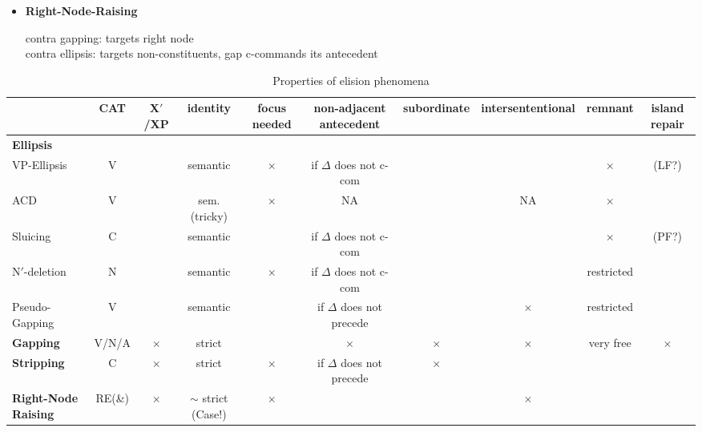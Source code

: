 \documentclass[landscape,10pt,oneside]{article}
\newcommand{\tophead}[1]{\textbf{\Large #1}}
\begin{document}
\begin{minipage}[t]{0.5\textwidth}
\begin{itemize}
		\item \tophead{Right-Node-Raising}
% 
		contra gapping: targets right node\\
		contra ellipsis: targets non-constituents, gap c-commands its antecedent
\end{itemize}
\end{minipage}

\begin{table}[tbh]
\begin{center}
\begin{tabular}{lccccccccc}
	& CAT & X$'$/XP & identity & focus needed & non-adjacent antecedent & subordinate & intersententional & remnant & island repair\\ \hline
	\textbf{Ellipsis} & & & & & & & & &\\
	\quad VP-Ellipsis & V & \checkmark & semantic & $\times$ & if $\Delta$ does not c-com & \checkmark & \checkmark & $\times$ & \checkmark (LF?)\\
	\quad ACD & V & \checkmark & sem. (tricky) & $\times$ & NA & \checkmark & NA & $\times$ &\\
	\quad Sluicing & C & \checkmark & semantic & & if $\Delta$ does not c-com & \checkmark & \checkmark & $\times$ & \checkmark (PF?)\\
	\quad N$'$-deletion & N & \checkmark & semantic & $\times$ & if $\Delta$ does not c-com & \checkmark & \checkmark & restricted &\\
	\quad Pseudo-Gapping & V & \checkmark & semantic & \checkmark & if $\Delta$ does not precede & \checkmark & $\times$ & restricted &\\
	\textbf{Gapping} & V/N/A & $\times$ & strict & \checkmark & $\times$ & $\times$ & $\times$ & very free & $\times$ \\
	\textbf{Stripping} & C & $\times$ & strict & $\times$ & if $\Delta$ does not precede & $\times$ & \checkmark & &\\
	\textbf{Right-Node Raising} & RE(\&) & $\times$ & $\sim$ strict (Case!) & $\times$ & \checkmark & & $\times$ & &\\
\end{tabular}
\end{center}
\caption{Properties of elision phenomena}
\end{table}
\end{document}
